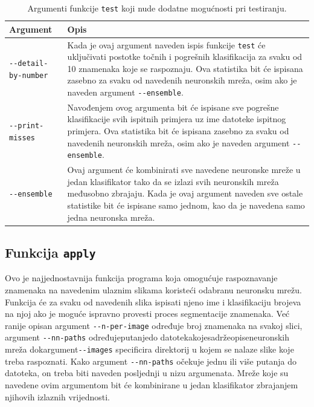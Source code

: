 \begin{table}[!htb]
    \caption{Argumenti funkcije \texttt{test} koji nude dodatne mogućnosti pri testiranju.}
    \label{tab:test-args}
    \scriptsize
    \centering
    \begin{tabular}{|M{3.5cm}|M{8.5cm}|}
        \hline
        Argument & Opis \\
        \hline
        \texttt{-{}-detail-by-number} & Kada je ovaj argument naveden ispis funkcije \texttt{test} će uključivati
        postotke točnih i pogrešnih klasifikacija za svaku od 10 znamenaka koje se raspoznaju. Ova statistika bit će
        ispisana zasebno za svaku od navedenih neuronskih mreža, osim ako je naveden argument \texttt{-{}-ensemble}. \\
        \hline
        \texttt{-{}-print-misses} & Navođenjem ovog argumenta bit će ispisane sve pogrešne klasifikacije svih ispitnih
        primjera uz ime datoteke ispitnog primjera. Ova statistika bit će ispisana zasebno za svaku od navedenih
        neuronskih mreža, osim ako je naveden argument \texttt{-{}-ensemble}. \\
        \hline
        \texttt{-{}-ensemble} & Ovaj argument će kombinirati sve navedene neuronske mreže u jedan klasifikator tako da
        se izlazi svih neuronskih mreža međusobno zbrajaju. Kada je ovaj argument naveden sve ostale statistike bit će
        ispisane samo jednom, kao da je navedena samo jedna neuronska mreža. \\
        \hline
    \end{tabular}
\end{table}

\subsection{Funkcija \texttt{apply}}
\label{subsec:funkcija-apply}
Ovo je najjednostavnija funkcija programa koja omogućuje raspoznavanje znamenaka na navedenim ulaznim slikama koristeći
odabranu neuronsku mrežu. Funkcija će za svaku od navedenih slika ispisati njeno ime i klasifikaciju brojeva na njoj
ako je moguće ispravno provesti proces segmentacije znamenaka. Već ranije opisan argument \texttt{-{}-n-per-image}
određuje broj znamenaka na svakoj slici, argument \texttt{-{}-nn-paths} određuje\hfill{}putanje\hfill{}do\hfill{}
datoteka\hfill{}koje\hfill{}sadrže\hfill{}opise\hfill{}neuronskih mreža dok\hfill{}argument\break\texttt{-{}-images}
specificira direktorij u kojem se nalaze slike koje treba raspoznati. Kako argument \texttt{-{}-nn-paths} očekuje jednu
ili više putanja do datoteka, on treba biti naveden posljednji u nizu argumenata. Mreže koje su navedene ovim argumentom
bit će kombinirane u jedan klasifikator zbrajanjem njihovih izlaznih vrijednosti.
